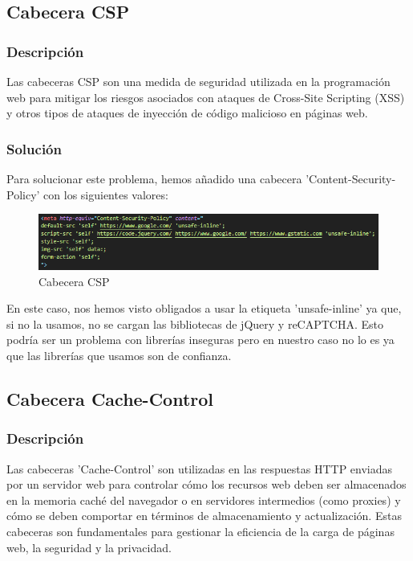 \documentclass{report}
\begin{document}
            \subsection{Cabecera CSP}
                \subsubsection{Descripción}
                    Las cabeceras CSP son una medida de seguridad utilizada en la programación web para mitigar los riesgos asociados con ataques de Cross-Site Scripting (XSS) y otros tipos de ataques de inyección de código malicioso en páginas web.
                \subsubsection{Solución}
                    Para solucionar este problema, hemos añadido una cabecera 'Content-Security-Policy' con los siguientes valores:
                    \begin{figure}[H]
                        \centering
                        \includegraphics[width=\textwidth]{./img/vulnerabilidades/3.5/2.1.png}
                        \caption{Cabecera CSP}
                    \end{figure}
                    En este caso, nos hemos visto obligados a usar la etiqueta 'unsafe-inline' ya que, si no la usamos, no se cargan las bibliotecas de jQuery y reCAPTCHA.
                    Esto podría ser un problema con librerías inseguras pero en nuestro caso no lo es ya que las librerías que usamos son de confianza.
            \clearpage
            \subsection{Cabecera Cache-Control}
                \subsubsection{Descripción}
                    Las cabeceras 'Cache-Control' son utilizadas en las respuestas HTTP enviadas por un servidor web para controlar cómo los recursos web deben ser almacenados en la memoria caché del navegador o en servidores intermedios (como proxies) y cómo se deben comportar en términos de almacenamiento y actualización. Estas cabeceras son fundamentales para gestionar la eficiencia de la carga de páginas web, la seguridad y la privacidad.
\end{document}
